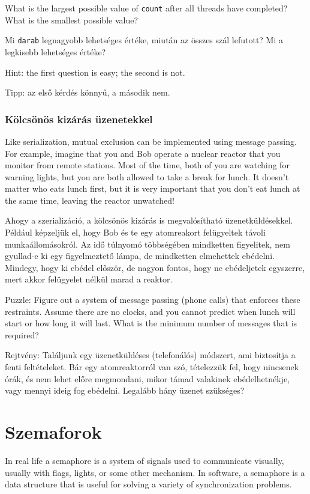 \documentclass{book}
\newcommand{\clearemptydoublepage}{\newpage\cleardoublepage}
\begin{document}
What is the largest possible value of {\tt count} after all threads
have completed?  What is the smallest possible value?

Mi {\tt darab} legnagyobb lehetséges értéke, miután az összes szál lefutott?
Mi a legkisebb lehetséges értéke?

Hint: the first question is easy; the second is not.

Tipp: az első kérdés könnyű, a második nem.

\subsection{Kölcsönös kizárás üzenetekkel}

Like serialization, mutual exclusion
can be implemented using message passing.  For example, imagine that
you and Bob operate a nuclear reactor that you monitor from remote
stations.  Most of the time, both of you are watching for warning
lights, but you are both allowed to take a break for lunch.  It
doesn't matter who eats lunch first, but it is very important that
you don't eat lunch at the same time, leaving the reactor unwatched!

Ahogy a szerializáció, a kölcsönös kizárás is megvalósítható
üzenetküldésekkel. Például képzeljük el, hogy Bob és te egy
atomreakort felügyeltek távoli munkaállomásokról. Az idő túlnyomó többségében
mindketten figyelitek, nem gyullad-e ki egy figyelmeztető lámpa,
de mindketten elmehettek ebédelni. Mindegy, hogy ki ebédel először,
de nagyon fontos, hogy ne ebédeljetek egyszerre, mert akkor felügyelet
nélkül marad a reaktor.

Puzzle: Figure out a system of message passing (phone calls) that
enforces these restraints.  Assume there are no clocks, and you
cannot predict when lunch will start or how long it will last.  What
is the minimum number of messages that is required?

Rejtvény: Találjunk egy üzenetküldéses (telefonálós) módszert,
ami biztosítja a fenti feltételeket. Bár egy atomreaktorról
van szó, tételezzük fel, hogy nincsenek órák, és nem lehet
előre megmondani, mikor támad valakinek ebédelhetnékje,
vagy mennyi ideig fog ebédelni. Legalább hány üzenet szükséges?

\clearemptydoublepage
\chapter{Szemaforok}

In real life a semaphore is a system of signals used to communicate
visually, usually with flags, lights, or some other mechanism.  In
software, a semaphore is a data structure that is useful for solving a
variety of synchronization problems.
\end{document}
